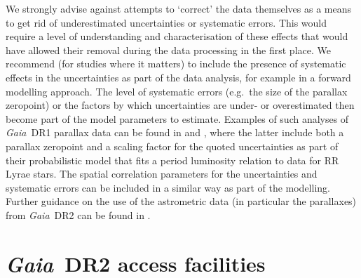\documentclass[longauth]{aa_gaia} %
\newcommand\gaia{\textit{Gaia}}
\newcommand\gdr[1]{\gaia~DR#1}
\begin{document}
We strongly advise against attempts to `correct' the data themselves as a means to get rid of
underestimated uncertainties or systematic errors. This would require a level of understanding and
characterisation of these effects that would have allowed their removal during the data processing
in the first place. We recommend (for studies where it matters) to include the presence of
systematic effects in the uncertainties as part of the data analysis, for example in a forward
modelling approach. The level of systematic errors (e.g.\ the size of the parallax zeropoint) or the
factors by which uncertainties are under- or overestimated then become part of the model parameters
to estimate.  Examples of such analyses of \gdr{1} parallax data can be found in
\cite{2017A&A...599A..67C} and \cite{2017ApJ...838..107S}, where the latter include both a parallax
zeropoint and a scaling factor for the quoted uncertainties as part of their probabilistic model
that fits a period luminosity relation to data for RR Lyrae stars. The spatial correlation
parameters for the uncertainties and systematic errors can be included in a similar way as part of
the modelling. Further guidance on the use of the astrometric data (in particular the parallaxes)
from \gdr{2} can be found in \cite{DR2-DPACP-38}.

%
%

\section{\gdr{2} access facilities}
\label{sec:access}
\end{document}
